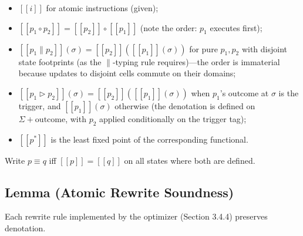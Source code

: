 \documentclass[
  11pt,
]{article}
\providecommand{\tightlist}{%
  \setlength{\itemsep}{0pt}\setlength{\parskip}{0pt}}
\newcommand{\llbracket}{[\![}
\newcommand{\rrbracket}{]\!]}
\begin{document}
\begin{itemize}
\tightlist
\item
  \(\llbracket i \rrbracket\) for atomic instructions (given);
\item
  \(\llbracket p_1 \circ p_2 \rrbracket = \llbracket p_2 \rrbracket \circ \llbracket p_1 \rrbracket\)
  (note the order: \(p_1\) executes first);
\item
  \(\llbracket p_1 \parallel p_2 \rrbracket(\sigma) = \llbracket p_2 \rrbracket(\llbracket p_1 \rrbracket(\sigma))\)
  for pure \(p_1, p_2\) with disjoint state footprints (as the
  \(\parallel\)-typing rule requires)---the order is immaterial because
  updates to disjoint cells commute on their domains;
\item
  \(\llbracket p_1 \triangleright p_2 \rrbracket(\sigma) = \llbracket p_2 \rrbracket(\llbracket p_1 \rrbracket(\sigma))\)
  when \(p_1\)'s outcome at \(\sigma\) is the trigger, and
  \(\llbracket p_1 \rrbracket(\sigma)\) otherwise (the denotation is
  defined on \(\Sigma + \text{outcome}\), with \(p_2\) applied
  conditionally on the trigger tag);
\item
  \(\llbracket p^* \rrbracket\) is the least fixed point of the
  corresponding functional.
\end{itemize}

Write \(p \equiv q\) iff
\(\llbracket p \rrbracket = \llbracket q \rrbracket\) on all states
where both are defined.

\subsection{Lemma (Atomic Rewrite
Soundness)}\label{lemma-atomic-rewrite-soundness}

Each rewrite rule implemented by the optimizer (Section 3.4.4) preserves
denotation.
\end{document}
